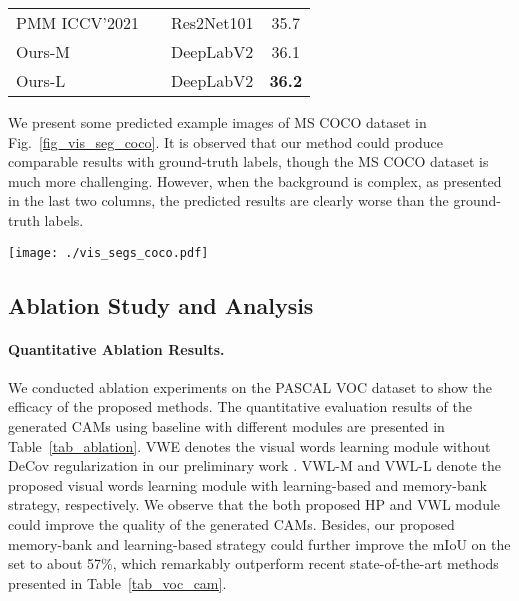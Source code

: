 \begin{table}[!tp]
\begin{tabular}{l|c|c|c}
    PMM              \tiny ICCV'2021       &                                  & Res2Net101                  & 35.7          \\
    \rowcolor[HTML]{fafafa}
    Ours-M                                 &                                  & DeepLabV2                     & 36.1          \\
    \rowcolor[HTML]{eaeaea}
    Ours-L                                 &                                  & DeepLabV2                     & \textbf{36.2} \\ \bottomrule
  \end{tabular}

\end{table}

\par We present some predicted example images of MS COCO  dataset in Fig.~\ref{fig_vis_seg_coco}. It is observed that our method could produce comparable results with ground-truth labels, though the MS COCO dataset is much more challenging. However, when the background is complex, as presented in the last two columns, the predicted results are clearly worse than the ground-truth labels.


\begin{figure*}[htbp]
  \centering
  \texttt{[image: ./vis\_segs\_coco.pdf]}
  \caption{Examples of the predicted labels from MS COCO  dataset.}
  \label{fig_vis_seg_coco}
\end{figure*}

\subsection{Ablation Study and Analysis}
\label{ablation}

\paragraph{\textbf{Quantitative Ablation Results.}} We conducted ablation experiments on the PASCAL VOC dataset to show the efficacy of the proposed methods. The quantitative evaluation results of the generated CAMs using baseline with different modules are presented in Table~\ref{tab_ablation}. VWE denotes the visual words learning module without DeCov regularization in our preliminary work \citep{ru2021learning}. VWL-M and VWL-L denote the proposed visual words learning module with learning-based and memory-bank strategy, respectively. We observe that the both proposed HP and VWL module could improve the quality of the generated CAMs. Besides, our proposed memory-bank and learning-based strategy could further improve the mIoU on the  set to about 57\%, which remarkably outperform recent state-of-the-art methods presented in Table~\ref{tab_voc_cam}.

